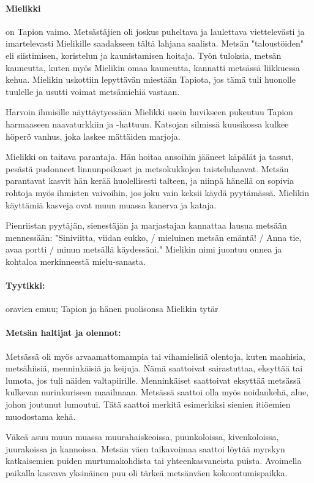   \paragraph{Mielikki} on Tapion vaimo. Metsästäjien oli joskus puheltava ja laulettava 
    viettelevästi ja imartelevasti Mielikille saadakseen tältä lahjana saalista. Metsän 
    "taloustöiden" eli siistimisen, koristelun ja kaunistamisen hoitaja. Työn tuloksia, metsän 
    kauneutta, kuten myös Mielikin omaa kauneutta, kannatti metsässä liikkuessa kehua. Mielikin uskottiin 
    lepyttävän miestään Tapiota, jos tämä tuli huonolle tuulelle ja usutti voimat metsämiehiä 
    vastaan. \par Harvoin ihmisille näyttäytyessään Mielikki usein huvikseen pukeutuu Tapion 
    harmaaseen naavaturkkiin ja -hattuun. Katsojan silmissä kuu\-sikossa kulkee höperö vanhus, 
    joka laskee mättäiden marjoja. \par Mielikki on taitava parantaja. Hän hoitaa ansoihin jääneet 
    käpälät ja tassut, pesästä pudonneet linnunpoikaset ja metsokukkojen taisteluhaavat. Metsän 
    parantavat kasvit hän kerää huolellisesti talteen, ja niinpä hänellä on sopivia rohtoja 
    myös ihmisten vaivoihin, jos joku vain keksii käydä pyytämässä. Mielikin käyttämiä kasveja 
    ovat muun muassa kanerva ja kataja. \par Pienriistan pyytäjän, sienestäjän ja marjastajan 
    kannattaa lausua metsään mennessään: "Siniviitta, viidan eukko, / mieluinen metsän 
    e\-mäntä! / Anna tie, avaa portti / minun metsällä käydessäni." Mielikin nimi juontuu onnea 
    ja kohtaloa merkinneestä mielu-sanasta.
  \paragraph{Tyytikki:} oravien emuu; Tapion ja hänen puolisonsa Mielikin tytär
  \paragraph{Metsän haltijat ja olennot:} Metsässä oli myös arvaamattomampia tai vihamielisiä 
    olentoja, kuten maahisia, metsähiisiä, menninkäisiä ja keijuja. Nämä saattoivat sairastuttaa, 
    eksyttää tai lumota, jos tuli näiden valtapiirille. Menninkäiset saattoivat eksyttää metsässä 
    kulkevan nurinkuriseen maailmaan. Metsässä saattoi olla myös noidankehä, alue, johon joutunut 
    lumoutui. Tätä saattoi merkitä esimerkiksi sienien itiöemien muodostama kehä. \par 
    Väkeä asuu muun muassa 
    muurahaiskeoissa, puunkoloissa, kivenkoloissa, juurakoissa ja kannoissa. Metsän väen 
    taikavoimaa saattoi löytää myrskyn katkaisemien puiden murtumakohdista tai yhteenkasvaneista 
    puista. Avoimella paikalla kasvava yksinäinen puu oli tärkeä metsänväen kokoontumispaikka.
